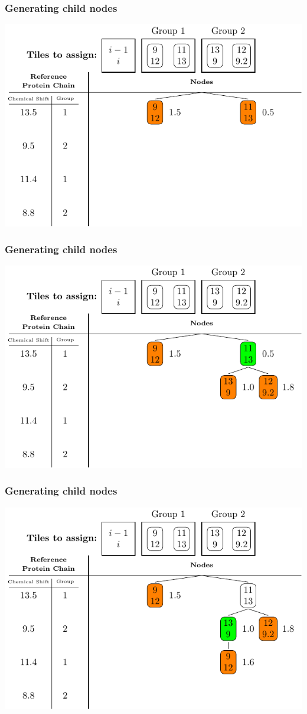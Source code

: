 \documentclass{beamer}
\begin{document}
\begin{frame}
	\frametitle{Generating child nodes}
	\vspace{-.5cm}
	\center
	\includegraphics[width=.9\textwidth]{tilePlacement/step3}
\end{frame}

\begin{frame}
	\frametitle{Generating child nodes}
	\vspace{-.5cm}
	\center
	\includegraphics[width=.9\textwidth]{tilePlacement/step4}
\end{frame}

\begin{frame}
	\frametitle{Generating child nodes} 
	\vspace{-.5cm}
	\center
	\includegraphics[width=.9\textwidth]{tilePlacement/step5}
\end{frame}
\end{document}
